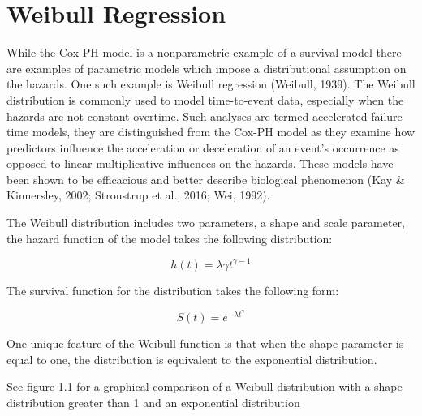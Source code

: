 \documentclass[12pt]{./styles/outhesis}
\begin{document}
\section{Weibull Regression}
While the Cox-PH model is a nonparametric example of a survival model
there are examples of parametric models which impose a distributional
assumption on the hazards. One such example is Weibull regression
(Weibull, 1939). The Weibull distribution is commonly used to model
time-to-event data, especially when the hazards are not constant
overtime. Such analyses are termed accelerated failure time models, they
are distinguished from the Cox-PH model as they examine how predictors
influence the acceleration or deceleration of an event's occurrence as
opposed to linear multiplicative influences on the hazards. These models
have been shown to be efficacious and better describe biological
phenomenon (Kay \& Kinnersley, 2002; Stroustrup et al., 2016; Wei, 1992).

The Weibull distribution includes two parameters, a shape and scale
parameter, the hazard function of the model takes the following
distribution:

\[
h(t) = \lambda \gamma t^{\gamma-1}
\]

The survival function for the distribution takes the following form:

\[
S(t) = e^{- \lambda t^\gamma}
\]

One unique feature of the Weibull function is that when the shape
parameter is equal to one, the distribution is equivalent to the
exponential distribution.

See figure 1.1 for a graphical comparison of a Weibull distribution with a
shape distribution greater than 1 and an exponential distribution
\end{document}
